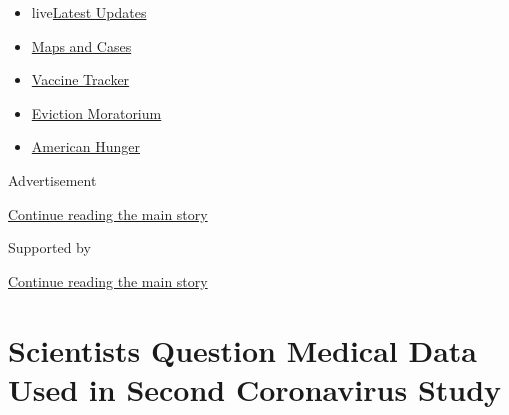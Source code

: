 \begin{itemize}
\tightlist
\item
  live\href{https://www.nytimes3xbfgragh.onion/2020/09/08/world/covid-19-coronavirus.html?name=styln-coronavirus-national\&region=TOP_BANNER\&block=storyline_menu_recirc\&action=click\&pgtype=Article\&impression_id=bb6df571-f1e2-11ea-a641-3789e99198fa\&variant=undefined}{Latest
  Updates}
\item
  \href{https://www.nytimes3xbfgragh.onion/interactive/2020/us/coronavirus-us-cases.html?name=styln-coronavirus-national\&region=TOP_BANNER\&block=storyline_menu_recirc\&action=click\&pgtype=Article\&impression_id=bb6df572-f1e2-11ea-a641-3789e99198fa\&variant=undefined}{Maps
  and Cases}
\item
  \href{https://www.nytimes3xbfgragh.onion/interactive/2020/science/coronavirus-vaccine-tracker.html?name=styln-coronavirus-national\&region=TOP_BANNER\&block=storyline_menu_recirc\&action=click\&pgtype=Article\&impression_id=bb6df573-f1e2-11ea-a641-3789e99198fa\&variant=undefined}{Vaccine
  Tracker}
\item
  \href{https://www.nytimes3xbfgragh.onion/2020/09/02/your-money/eviction-moratorium-covid.html?name=styln-coronavirus-national\&region=TOP_BANNER\&block=storyline_menu_recirc\&action=click\&pgtype=Article\&impression_id=bb6e1c80-f1e2-11ea-a641-3789e99198fa\&variant=undefined}{Eviction
  Moratorium}
\item
  \href{https://www.nytimes3xbfgragh.onion/interactive/2020/09/02/magazine/food-insecurity-hunger-us.html?name=styln-coronavirus-national\&region=TOP_BANNER\&block=storyline_menu_recirc\&action=click\&pgtype=Article\&impression_id=bb6e1c81-f1e2-11ea-a641-3789e99198fa\&variant=undefined}{American
  Hunger}
\end{itemize}

Advertisement

\protect\hyperlink{after-top}{Continue reading the main story}

Supported by

\protect\hyperlink{after-sponsor}{Continue reading the main story}

\hypertarget{scientists-question-medical-data-used-in-second-coronavirus-study}{%
\section{Scientists Question Medical Data Used in Second Coronavirus
Study}\label{scientists-question-medical-data-used-in-second-coronavirus-study}}

